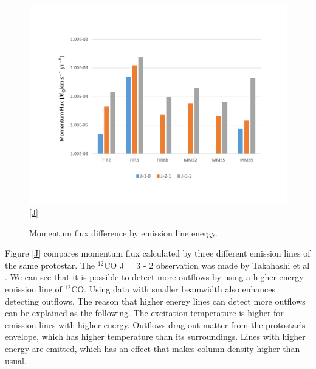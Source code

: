 \begin{figure}[h!]
	\centering
	\includegraphics[width=\textwidth]{outflow_J}
	\ref{J}
	\caption{Momentum flux difference by emission line energy.}
\end{figure}

Figure \ref{J} compares momentum flux calculated by three different emission lines of the same protostar. The $^{12}$CO J = 3 - 2 observation was made by Takahashi et al \cite{takahashi2008millimeter}. We can see that it is possible to detect more outflows by using a higher energy emission line of $^{12}$CO. Using data with smaller beamwidth also enhances detecting outflows. The reason that higher energy lines can detect more outflows can be explained as the following. The excitation temperature is higher for emission lines with higher energy. Outflows drag out matter from the protostar's envelope, which has higher temperature than its surroundings. Lines with higher energy are emitted, which has an effect that makes column density higher than usual.